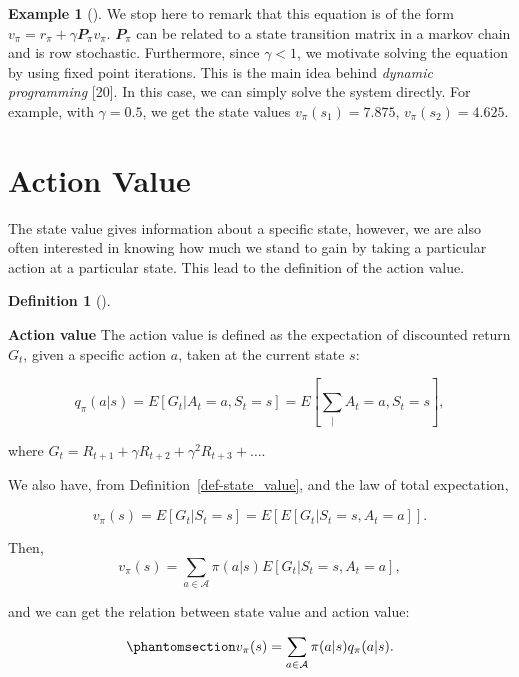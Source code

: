 \documentclass[
  letterpaper,
]{report}
\theoremstyle{definition}
\newtheorem{definition}{Definition}[chapter]
\theoremstyle{plain}
\theoremstyle{definition}
\newtheorem{example}{Example}[chapter]
\theoremstyle{remark}
\begin{document}
\begin{example}[]
We stop here to remark that this equation is of the form
\(v_\pi = r_\pi + \gamma \mathbfit{P}_\pi v_\pi\). \(\mathbfit{P}_\pi\)
can be related to a state transition matrix in a markov chain and is row
stochastic. Furthermore, since \(\gamma<1\), we motivate solving the
equation by using fixed point iterations. This is the main idea behind
\emph{dynamic programming} {[}20{]}. In this case, we can simply solve
the system directly. For example, with \(\gamma=0.5\), we get the state
values \(v_\pi(s_1) = 7.875\), \(v_\pi(s_2) = 4.625\).

\end{example}

\section{Action Value}\label{action-value}

The state value gives information about a specific state, however, we
are also often interested in knowing how much we stand to gain by taking
a particular action at a particular state. This lead to the definition
of the action value.

\begin{definition}[]\protect\hypertarget{def-action_value}{}\label{def-action_value}

\textbf{Action value} The action value is defined as the expectation of
discounted return \(G_t\), given a specific action \(a\), taken at the
current state \(s\):

\[
q_\pi(a|s) = E\left[G_t|A_t=a,S_t=s\right] = E\left[\sum_|A_t=a,S_t=s\right],
\]

where \(G_t = R_{t+1} + \gamma R_{t+2} + \gamma^2R_{t+3} + \dots\).

\end{definition}

We also have, from Definition~\ref{def-state_value}, and the law of
total expectation,

\[
v_\pi(s) = E[G_t|S_t = s] = E\left[E[G_t|S_t = s, A_t = a]\right].
\]

Then, \[
v_\pi(s) = \sum_{a\in\mathcal{A}}\pi(a|s)E\left[G_t|S_t=s,A_t =a\right],
\]

and we can get the relation between state value and action value:

\begin{equation}\phantomsection\label{eq-state_value_action_relation}{
v_\pi(s) = \sum_{a\in\mathcal{A}} \pi(a|s)q_\pi(a|s).
}\end{equation}
\end{document}
